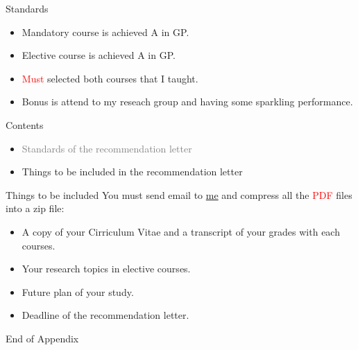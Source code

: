 \documentclass{beamer}
\begin{document}
\begin{frame}{Standards}
\begin{itemize}
\item Mandatory course is achieved A in GP.
\item Elective course is achieved A in GP.
\item \textcolor{red}{Must} selected both courses that I taught.
\item Bonus is attend to my reseach group and having some sparkling performance.
\end{itemize}
\end{frame}
\begin{frame}{Contents}
\begin{itemize}
\item \textcolor{gray}{Standards of the recommendation letter}
\item Things to be included in the recommendation letter
\end{itemize}
\end{frame}
\begin{frame}{Things to be included}
You must send email to \href{mailto:politics-tchsiao@gmail.com}{me} and compress all the \textcolor{red}{PDF} files into a zip file:
\begin{itemize}
\item A copy of your Cirriculum Vitae and a transcript of your grades with each courses.
\item Your research topics in elective courses.
\item Future plan of your study.
\item Deadline of the recommendation letter.
\end{itemize}
\end{frame}
\begin{frame}{}
\begin{center}
\Large{End of Appendix}
\end{center}
\end{frame}
\end{document}
